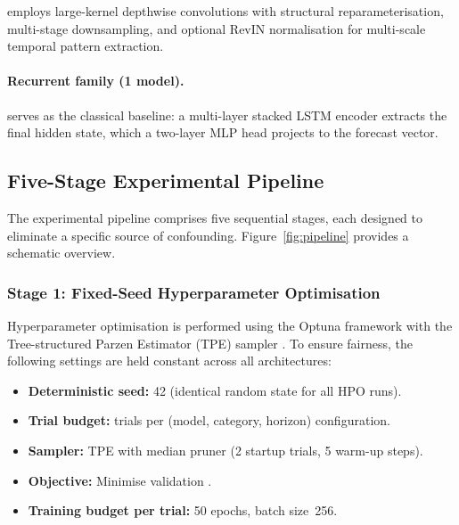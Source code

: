 \moderntcn \citep{Luo2024moderntcn} employs large-kernel depthwise convolutions with structural reparameterisation, multi-stage downsampling, and optional RevIN normalisation for multi-scale temporal pattern extraction.

\paragraph{Recurrent family (1 model).}
\lstm \citep{Hochreiter1997} serves as the classical baseline: a multi-layer stacked LSTM encoder extracts the final hidden state, which a two-layer MLP head projects to the forecast vector.



\subsection{Five-Stage Experimental Pipeline}
\label{sec:pipeline}

The experimental pipeline comprises five sequential stages, each designed to eliminate a specific source of confounding.  Figure~\ref{fig:pipeline} provides a schematic overview.

\subsubsection{Stage 1: Fixed-Seed Hyperparameter Optimisation}
\label{sec:stage1_hpo}

Hyperparameter optimisation is performed using the Optuna framework \citep{Akiba2019} with the Tree-structured Parzen Estimator (TPE) sampler \citep{Bergstra2011}.  To ensure fairness, the following settings are held constant across all architectures:

\begin{itemize}[nosep]
  \item \textbf{Deterministic seed:} 42 (identical random state for all HPO runs).
  \item \textbf{Trial budget:} \ntrials trials per (model, category, horizon) configuration.
  \item \textbf{Sampler:} TPE with median pruner (2 startup trials, 5 warm-up steps).
  \item \textbf{Objective:} Minimise validation \mse.
  \item \textbf{Training budget per trial:} 50 epochs, batch size~256.
\end{itemize}

